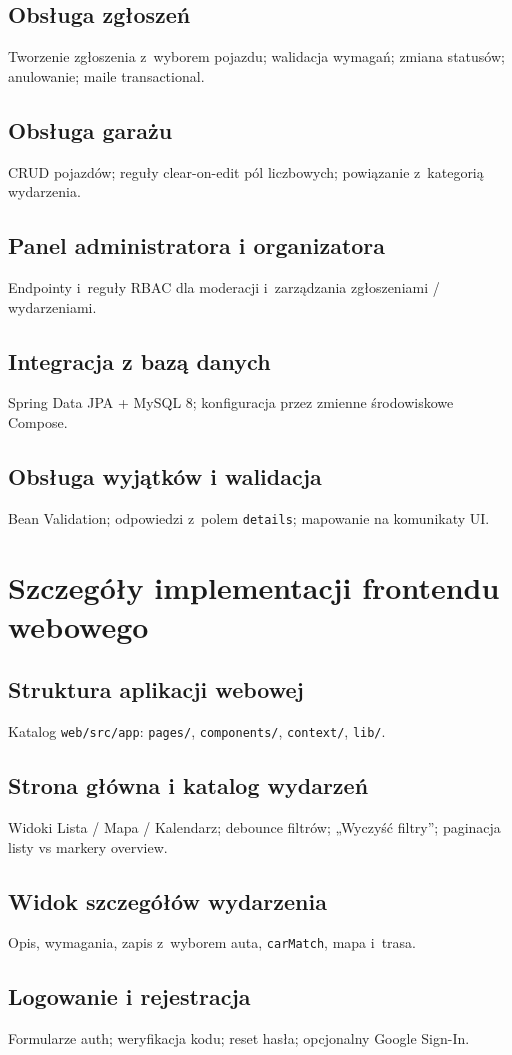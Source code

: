 \documentclass{sprz}
\begin{document}
\section{Obsługa zgłoszeń}
Tworzenie zgłoszenia z~wyborem pojazdu; walidacja wymagań; zmiana statusów; anulowanie; maile transactional.
\section{Obsługa garażu}
CRUD pojazdów; reguły clear-on-edit pól liczbowych; powiązanie z~kategorią wydarzenia.
\section{Panel administratora i organizatora}
Endpointy i~reguły RBAC dla moderacji i~zarządzania zgłoszeniami / wydarzeniami.
\section{Integracja z bazą danych}
Spring Data JPA + MySQL 8; konfiguracja przez zmienne środowiskowe Compose.
\section{Obsługa wyjątków i walidacja}
Bean Validation; odpowiedzi z~polem \texttt{details}; mapowanie na komunikaty UI.

\chapter{Szczegóły implementacji frontendu webowego}
\section{Struktura aplikacji webowej}
Katalog \texttt{web/src/app}: \texttt{pages/}, \texttt{components/}, \texttt{context/}, \texttt{lib/}.
\section{Strona główna i katalog wydarzeń}
Widoki Lista / Mapa / Kalendarz; debounce filtrów; „Wyczyść filtry”; paginacja listy vs markery overview.
\section{Widok szczegółów wydarzenia}
Opis, wymagania, zapis z~wyborem auta, \texttt{carMatch}, mapa i~trasa.
\section{Logowanie i rejestracja}
Formularze auth; weryfikacja kodu; reset hasła; opcjonalny Google Sign-In.
\end{document}
